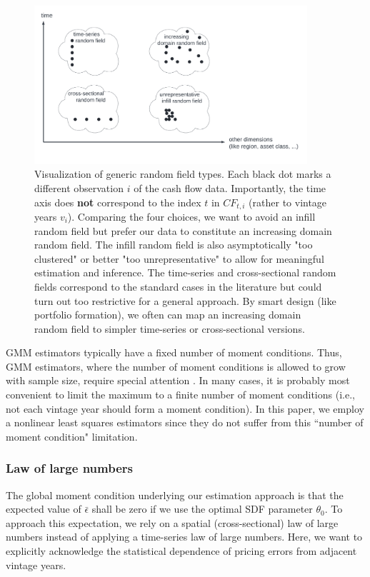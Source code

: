 \documentclass[12pt]{article}
\begin{document}
\begin{figure}[ht]
	\centering
	\includegraphics[width=0.9\textwidth]{Figures/spatial/randomfields.pdf}
	\caption{
		Visualization of generic random field types.
		Each black dot marks a different observation $i$ of the cash flow data.
		Importantly, the time axis does \textbf{not} correspond to the index $t$ in $CF_{t,i}$ (rather to vintage years $v_i$).
		Comparing the four choices, we want to avoid an infill random field but prefer our data to constitute an increasing domain random field.
		The infill random field is also asymptotically "too clustered" or better "too unrepresentative" to allow for meaningful estimation and inference.
		The time-series and cross-sectional random fields correspond to the standard cases in the literature but could turn out too restrictive for a general approach.
		By smart design (like portfolio formation), we often can map an increasing domain random field to simpler time-series or cross-sectional versions.
	}
	\label{fig:randomfields}
\end{figure}

GMM estimators typically have a fixed number of moment conditions.
Thus, GMM estimators, where the number of moment conditions is allowed to grow with sample size, require special attention \citep{HP06,NW09}.
In many cases, it is probably most convenient to limit the maximum to a finite number of moment conditions (i.e., not each vintage year should form a moment condition).
In this paper, we employ a nonlinear least squares estimators since they do not suffer from this ``number of moment condition" limitation.


\subsubsection{Law of large numbers}

The global moment condition underlying our estimation approach is that the expected value of $\bar{\epsilon}$ shall be zero if we use the optimal SDF parameter $\theta_0$. 
To approach this expectation, we rely on a spatial (cross-sectional) law of large numbers instead of applying a time-series law of large numbers.
Here, we want to explicitly acknowledge the statistical dependence of pricing errors from adjacent vintage years.
\end{document}
